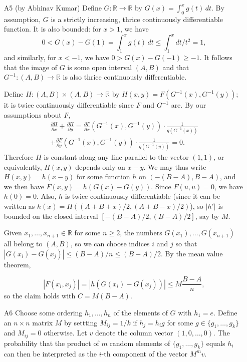\documentclass[amssymb,twocolumn,pra,10pt,aps]{revtex4-1}
\newcommand{\RR}{\mathbb{R}}
\begin{document}
\begin{itemize}
\item[A5] (by Abhinav Kumar) Define $G : \RR \to \RR$ by $G(x) = \int_0^x
g(t)\,dt$. By assumption, $G$ is a strictly increasing, thrice continuously
differentiable function. It is also bounded: for $x>1$, we have
\[
0 < G(x)-G(1) = \int_1^x g(t)\,dt \leq \int_1^x dt/t^2 = 1,
\]
and similarly, for $x<-1$, we have $0 > G(x)-G(-1) \geq -1$.
It follows that the image of $G$ is some open interval $(A,B)$
and that $G^{-1}: (A,B) \to \RR$ is also thrice continuously differentiable.

Define $H: (A,B) \times (A,B) \to \RR$ by $H(x,y) = F(G^{-1}(x), G^{-1}(y))$;
it is twice continuously differentiable since $F$ and $G^{-1}$ are.
By our assumptions about $F$,
\begin{multline*}
\frac{\partial H}{\partial x} + \frac{\partial H}{\partial y} =
    \frac{\partial F}{\partial x}(G^{-1}(x), G^{-1}(y))
    \cdot \frac{1}{g(G^{-1}(x))}\\
    + \frac{\partial F}{\partial y}(G^{-1}(x), G^{-1}(y))
    \cdot \frac{1}{g(G^{-1}(y))} = 0.
\end{multline*}
Therefore $H$ is constant along any line parallel to the vector $(1,1)$,
or equivalently, $H(x,y)$ depends only on $x-y$. We may thus write $H(x,y) =
h(x-y)$ for some function $h$ on $(-(B-A), B-A)$, and we then have $F(x,y)
= h(G(x) - G(y))$.  Since $F(u,u) = 0$, we have $h(0) = 0$. Also, $h$
is twice continuously differentiable (since it can be written as $h(x)
= H((A+B+x)/2,(A+B-x)/2)$), so $|h'|$ is bounded on the closed interval $[-(B-A)/2,
(B-A)/2]$, say by $M$.

Given $x_1,\dots,x_{n+1} \in \RR$ for some $n \geq 2$, the numbers
$G(x_1),\dots,G(x_{n+1})$ all belong to $(A,B)$, so we can choose indices
$i$ and $j$ so that $|G(x_i) - G(x_j)| \leq (B-A)/n \leq (B-A)/2$.  By the
mean value theorem,

\[
|F(x_i, x_j)| = |h(G(x_i) - G(x_j))| \leq M \frac{B-A}{n},
\]
so the claim holds with $C = M(B-A)$.

\item[A6]
Choose some ordering $h_1,\dots, h_n$ of the elements of $G$ with $h_1 = e$.
Define an $n \times n$ matrix $M$
by settting $M_{ij} = 1/k$ if $h_j = h_i g$ for some $g \in \{g_1,\dots,g_k\}$ and $M_{ij} = 0$ otherwise.
Let $v$ denote the column vector $(1,0,\dots,0)$. The probability
that the product of $m$ random elements of $\{g_1,\dots,g_k\}$
equals $h_i$ can then be interpreted as the $i$-th component of the vector
$M^m v$.


\end{itemize}
\end{document}
